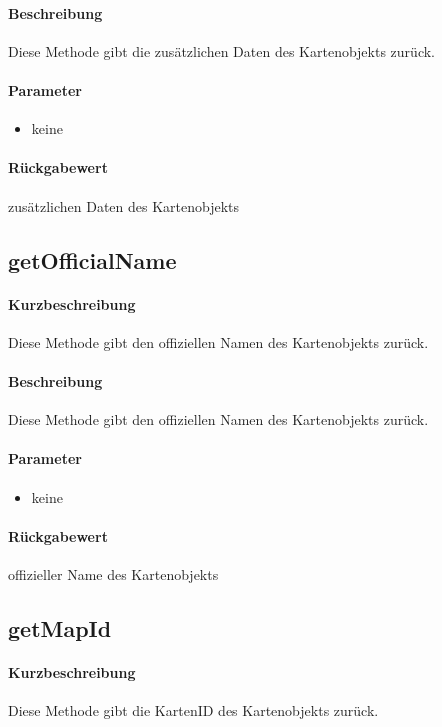 \paragraph*{Beschreibung}
Diese Methode gibt die zusätzlichen Daten des Kartenobjekts zurück.
\paragraph*{Parameter}
\begin{itemize}
    \item keine
\end{itemize}
\paragraph*{Rückgabewert}
zusätzlichen Daten des Kartenobjekts

\subsection{getOfficialName}%
\paragraph*{Kurzbeschreibung}
Diese Methode gibt den offiziellen Namen des Kartenobjekts zurück.
\paragraph*{Beschreibung}
Diese Methode gibt den offiziellen Namen des Kartenobjekts zurück.
\paragraph*{Parameter}
\begin{itemize}
    \item keine
\end{itemize}
\paragraph*{Rückgabewert}
offizieller Name des Kartenobjekts

\subsection{getMapId}%
\paragraph*{Kurzbeschreibung}
Diese Methode gibt die KartenID des Kartenobjekts zurück.
